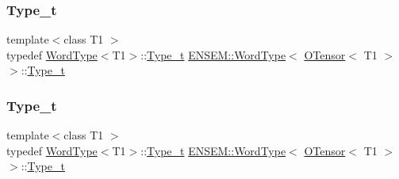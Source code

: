 \subsubsection{\texorpdfstring{Type\_t}{Type\_t}\hspace{0.1cm}{\footnotesize\ttfamily [1/3]}}
{\footnotesize\ttfamily template$<$class T1 $>$ \\
typedef \mbox{\hyperlink{structENSEM_1_1WordType}{Word\+Type}}$<$T1$>$\+::\mbox{\hyperlink{structENSEM_1_1WordType_3_01OTensor_3_01T1_01_4_01_4_a7eb2940d941e35ae189a26d059d7668b}{Type\+\_\+t}} \mbox{\hyperlink{structENSEM_1_1WordType}{E\+N\+S\+E\+M\+::\+Word\+Type}}$<$ \mbox{\hyperlink{classENSEM_1_1OTensor}{O\+Tensor}}$<$ T1 $>$ $>$\+::\mbox{\hyperlink{structENSEM_1_1WordType_3_01OTensor_3_01T1_01_4_01_4_a7eb2940d941e35ae189a26d059d7668b}{Type\+\_\+t}}}

\mbox{\label{structENSEM_1_1WordType_3_01OTensor_3_01T1_01_4_01_4_a7eb2940d941e35ae189a26d059d7668b}} 
\subsubsection{\texorpdfstring{Type\_t}{Type\_t}\hspace{0.1cm}{\footnotesize\ttfamily [2/3]}}
{\footnotesize\ttfamily template$<$class T1 $>$ \\
typedef \mbox{\hyperlink{structENSEM_1_1WordType}{Word\+Type}}$<$T1$>$\+::\mbox{\hyperlink{structENSEM_1_1WordType_3_01OTensor_3_01T1_01_4_01_4_a7eb2940d941e35ae189a26d059d7668b}{Type\+\_\+t}} \mbox{\hyperlink{structENSEM_1_1WordType}{E\+N\+S\+E\+M\+::\+Word\+Type}}$<$ \mbox{\hyperlink{classENSEM_1_1OTensor}{O\+Tensor}}$<$ T1 $>$ $>$\+::\mbox{\hyperlink{structENSEM_1_1WordType_3_01OTensor_3_01T1_01_4_01_4_a7eb2940d941e35ae189a26d059d7668b}{Type\+\_\+t}}}

\mbox{\label{structENSEM_1_1WordType_3_01OTensor_3_01T1_01_4_01_4_a7eb2940d941e35ae189a26d059d7668b}} 
